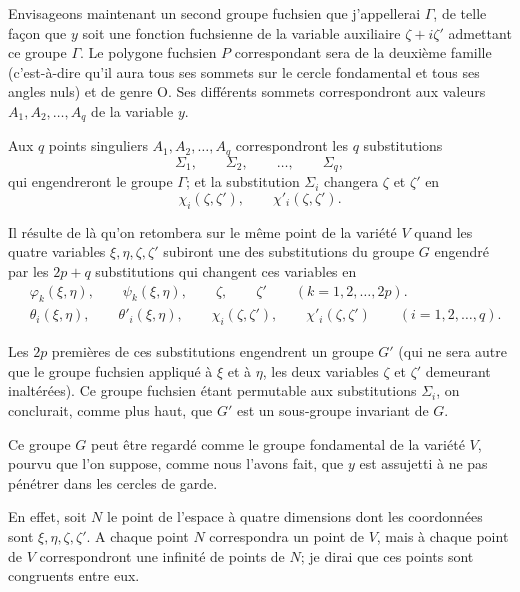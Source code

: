 \documentclass{article}
\begin{document}
Envisageons maintenant un second groupe fuchsien que j'appellerai $\Gamma$, de telle façon que $y$ soit une fonction fuchsienne de la variable auxiliaire $\zeta + i\zeta'$ admettant ce groupe $\Gamma$. Le polygone fuchsien $P$ correspondant sera de la deuxième famille (c'est-à-dire qu'il aura tous ses sommets sur le cercle fondamental et tous ses angles nuls) et de genre O. Ses différents sommets correspondront aux valeurs $A_{1}, A_{2}, \ldots, A_{q}$ de la variable $y$.

Aux $q$ points singuliers $A_{1}, A_{2}, \ldots, A_{q}$ correspondront les $q$ substitutions
\[ \Sigma_{1}, \qquad \Sigma_{2}, \qquad \ldots, \qquad \Sigma_{q}, \]
qui engendreront le groupe $\Gamma$; et la substitution $\Sigma_{i}$ changera $\zeta$ et $\zeta'$ en
\[ \chi_{i}(\zeta, \zeta'), \qquad \chi'_{i}(\zeta, \zeta'). \]

Il résulte de là qu'on retombera sur le même point de la variété $V$ quand les quatre variables $\xi, \eta, \zeta, \zeta'$ subiront une des substitutions du groupe $G$ engendré par les $2p + q$ substitutions
qui changent ces variables en
\[ \begin{aligned} &\varphi_{k}(\xi, \eta), \qquad \psi_{k}(\xi, \eta), \qquad \zeta, \qquad \zeta' \qquad (k = 1, 2, \ldots, 2p).\\ &\theta_{i}(\xi, \eta), \qquad \theta'_{i}(\xi, \eta), \qquad \chi_{i}(\zeta, \zeta'), \qquad \chi'_{i}(\zeta, \zeta') \qquad (i = 1, 2, \ldots, q). \end{aligned} \]

Les $2p$ premières de ces substitutions engendrent un groupe $G'$ (qui ne sera autre que le groupe fuchsien appliqué à $\xi$ et à $\eta$, les deux variables $\zeta$ et $\zeta'$ demeurant inaltérées). Ce groupe fuchsien étant permutable aux substitutions $\Sigma_{i}$, on conclurait, comme plus haut, que $G'$ est un sous-groupe invariant de $G$.

Ce groupe $G$ peut être regardé comme le groupe fondamental de la variété $V$, pourvu que l'on suppose, comme nous l'avons fait, que $y$ est assujetti à ne pas pénétrer dans les cercles de garde.

En effet, soit $N$ le point de l'espace à quatre dimensions dont les coordonnées sont $\xi, \eta, \zeta, \zeta'$. A chaque point $N$ correspondra un point de $V$, mais à chaque point de $V$ correspondront une infinité de points de $N$; je dirai que ces points sont congruents entre eux.
\end{document}
